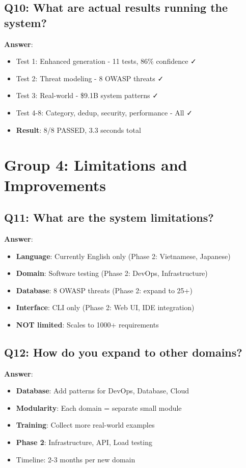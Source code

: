 \documentclass[12pt,a4paper]{report}
\begin{document}
\subsection{Q10: What are actual results running the system?}

\textbf{Answer}:
\begin{itemize}
    \item Test 1: Enhanced generation - 11 tests, 86\% confidence ✓
    \item Test 2: Threat modeling - 8 OWASP threats ✓
    \item Test 3: Real-world - \$9.1B system patterns ✓
    \item Test 4-8: Category, dedup, security, performance - All ✓
    \item \textbf{Result}: 8/8 PASSED, 3.3 seconds total
\end{itemize}

\section{Group 4: Limitations and Improvements}

\subsection{Q11: What are the system limitations?}

\textbf{Answer}:
\begin{itemize}
    \item \textbf{Language}: Currently English only (Phase 2: Vietnamese, Japanese)
    \item \textbf{Domain}: Software testing (Phase 2: DevOps, Infrastructure)
    \item \textbf{Database}: 8 OWASP threats (Phase 2: expand to 25+)
    \item \textbf{Interface}: CLI only (Phase 2: Web UI, IDE integration)
    \item \textbf{NOT limited}: Scales to 1000+ requirements
\end{itemize}

\subsection{Q12: How do you expand to other domains?}

\textbf{Answer}:
\begin{itemize}
    \item \textbf{Database}: Add patterns for DevOps, Database, Cloud
    \item \textbf{Modularity}: Each domain = separate small module
    \item \textbf{Training}: Collect more real-world examples
    \item \textbf{Phase 2}: Infrastructure, API, Load testing
    \item Timeline: 2-3 months per new domain
\end{itemize}
\end{document}
